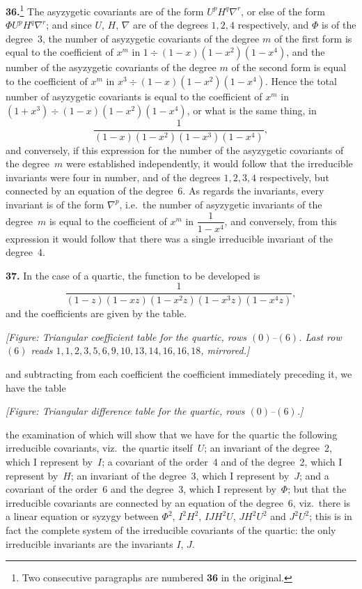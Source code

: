 \documentclass[11pt]{article}
\begin{document}
\textbf{36.}\footnote{Two consecutive paragraphs are numbered \textbf{36} in the original.} The asyzygetic covariants are of the form $U^p H^q \nabla^r$, or else of the form $\Phi U^p H^q \nabla^r$; and since $U$, $H$, $\nabla$ are of the degrees $1, 2, 4$ respectively, and $\Phi$ is of the degree~3, the number of asyzygetic covariants of the degree $m$ of the first form is equal to the coefficient of $x^m$ in $1\div(1-x)(1-x^2)(1-x^4)$, and the number of the asyzygetic covariants of the degree $m$ of the second form is equal to the coefficient of $x^m$ in $x^3\div(1-x)(1-x^2)(1-x^4)$. Hence the total number of asyzygetic covariants is equal to the coefficient of $x^m$ in $(1+x^3)\div(1-x)(1-x^2)(1-x^4)$, or what is the same thing, in
\[
\frac{1}{(1-x)(1-x^2)(1-x^3)(1-x^4)},
\]
and conversely, if this expression for the number of the asyzygetic covariants of the degree~$m$ were established independently, it would follow that the irreducible invariants were four in number, and of the degrees $1, 2, 3, 4$ respectively, but connected by an equation of the degree~6. As regards the invariants, every invariant is of the form $\nabla^p$, i.e.\ the number of asyzygetic invariants of the degree~$m$ is equal to the coefficient of $x^m$ in $\dfrac{1}{1-x^4}$, and conversely, from this expression it would follow that there was a single irreducible invariant of the degree~4.

\textbf{37.} In the case of a quartic, the function to be developed is
\[
\frac{1}{(1-z)(1-xz)(1-x^2 z)(1-x^3 z)(1-x^4 z)},
\]
and the coefficients are given by the table.

\medskip
\noindent\textit{[Figure: Triangular coefficient table for the quartic, rows $(0)$--$(6)$. Last row $(6)$ reads $1, 1, 2, 3, 5, 6, 9, 10, 13, 14, 16, 16, 18$, mirrored.]}

and subtracting from each coefficient the coefficient immediately preceding it, we have the table

\medskip
\noindent\textit{[Figure: Triangular difference table for the quartic, rows $(0)$--$(6)$.]}

the examination of which will show that we have for the quartic the following irreducible covariants, viz.\ the quartic itself~$U$; an invariant of the degree~2, which I represent by~$I$; a covariant of the order~4 and of the degree~2, which I represent by~$H$; an invariant of the degree~3, which I represent by~$J$; and a covariant of the order~6 and the degree~3, which I represent by~$\Phi$; but that the irreducible covariants are connected by an equation of the degree~6, viz.\ there is a linear equation or syzygy between $\Phi^2$, $I^2 H^2$, $I J H^2 U$, $J H^2 U^2$ and $J^2 U^2$; this is in fact the complete system of the irreducible covariants of the quartic: the only irreducible invariants are the invariants $I$, $J$.
\end{document}
